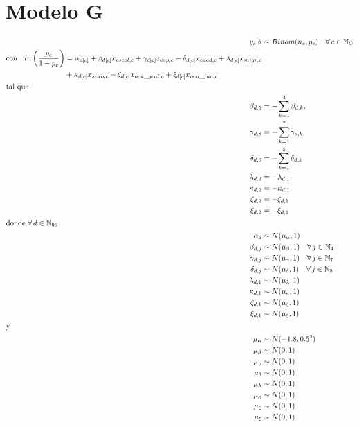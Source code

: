 \section*{Modelo G}

\begin{align}\label{eq:Modelo_Comp_G}
y_c|\theta & \sim Binom(n_c,p_c) \quad \forall \, c \in \mathbb{N}_C \nonumber \\
\begin{split}
\text{con} \quad ln\left(\dfrac{p_c}{1-p_c}\right) &= \alpha_{d[c]} + \beta_{d[c]} x_{escol,c} + \gamma_{d[c]} x_{csp,c} + \delta_{d[c]} x_{edad,c} + \lambda_{d[c]} x_{migr,c} \\
&+ \kappa_{d[c]} x_{sexo,c} + \zeta_{d[c]} x_{ocu\_gral,c} + \xi_{d[c]} x_{ocu\_juv,c} 
\end{split}\\
\intertext{tal que} 
\beta_{d,5} &= -\sum\limits_{k = 1}^{4} \beta_{d,k}, \nonumber \\
\gamma_{d,8} &= -\sum\limits_{k = 1}^{7} \gamma_{d,k} \nonumber \\
\delta_{d,6} &= -\sum\limits_{k = 1}^{5} \delta_{d,k} \nonumber \\
\lambda_{d,2} &= -\lambda_{d,1} \nonumber \\
\kappa_{d,2} &= -\kappa_{d,1} \nonumber \\
\zeta_{d,2} &= -\zeta_{d,1} \nonumber \\
\xi_{d,2} &= -\xi_{d,1} \nonumber \\
\intertext{donde $\forall \, d \in \mathbb{N}_{96}$}
\alpha_d &\sim N(\mu_{\alpha}, 1) \quad  \nonumber \\
\beta_{d,j} &\sim N(\mu_{\beta}, 1) \quad \forall \, j \in \mathbb{N}_{4} \nonumber \\
\gamma_{d,j} &\sim N(\mu_{\gamma}, 1) \quad \forall \, j \in \mathbb{N}_{7} \nonumber \\
\delta_{d,j} &\sim N(\mu_{\delta}, 1) \quad \forall \, j \in \mathbb{N}_{5}  \nonumber \\ 
\lambda_{d,1} &\sim N(\mu_{\lambda}, 1) \nonumber \\
\kappa_{d,1} &\sim N(\mu_{\kappa}, 1) \nonumber \\ 
\zeta_{d,1} &\sim N(\mu_{\zeta}, 1) \nonumber \\
\xi_{d,1} &\sim N(\mu_{\xi}, 1) \nonumber \\
\intertext{y}
\mu_{\alpha} &\sim N(-1.8,0.5^2) \nonumber \\
\mu_{\beta} &\sim N(0,1) \nonumber \\
\mu_{\gamma} &\sim N(0,1) \nonumber \\
\mu_{\delta} &\sim N(0,1) \nonumber \\
\mu_{\lambda} &\sim N(0,1) \nonumber \\
\mu_{\kappa} &\sim N(0,1) \nonumber \\
\mu_{\zeta} &\sim N(0,1) \nonumber \\
\mu_{\xi} &\sim N(0,1) \nonumber
\end{align}

